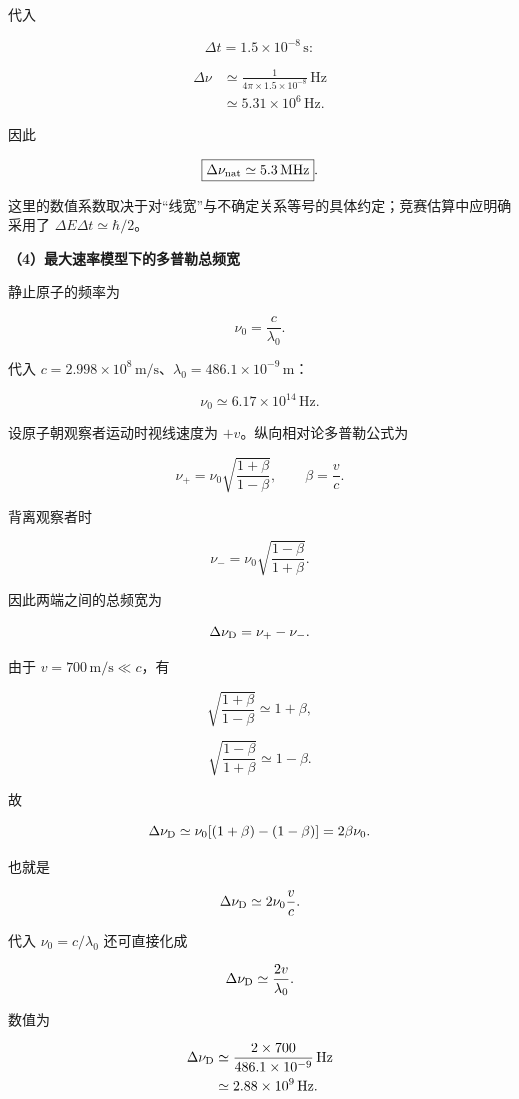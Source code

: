 \documentclass[12pt,a4paper,UTF8]{ctexart}
\begin{document}
代入

\[\Delta t=1.5\times10^{-8}\,\mathrm{s}:\]

\[
\begin{aligned}
\Delta\nu
&\simeq\frac{1}{4\pi\times1.5\times10^{-8}}\,\mathrm{Hz}\\
&\simeq5.31\times10^6\,\mathrm{Hz}.
\end{aligned}
\]

因此

\[
\boxed{\Delta\nu_{\rm nat}\simeq5.3\,\mathrm{MHz}}.
\]

这里的数值系数取决于对``线宽''与不确定关系等号的具体约定；竞赛估算中应明确采用了
\(\Delta E\Delta t\simeq\hbar/2\)。

\textbf{（4）最大速率模型下的多普勒总频宽}

静止原子的频率为

\[
\nu_0=\frac{c}{\lambda_0}.
\]

代入
\(c=2.998\times10^8\,\mathrm{m/s}\)、\(\lambda_0=486.1\times10^{-9}\,\mathrm m\)：

\[
\nu_0\simeq6.17\times10^{14}\,\mathrm{Hz}.
\]

设原子朝观察者运动时视线速度为 \(+v\)。纵向相对论多普勒公式为

\[
\nu_+=\nu_0\sqrt{\frac{1+\beta}{1-\beta}},
\qquad
\beta=\frac vc.
\]

背离观察者时

\[
\nu_-=\nu_0\sqrt{\frac{1-\beta}{1+\beta}}.
\]

因此两端之间的总频宽为

\[
\Delta\nu_{\rm D}=\nu_+-\nu_-.
\]

由于 \(v=700\,\mathrm{m/s}\ll c\)，有

\[
\sqrt{\frac{1+\beta}{1-\beta}}\simeq1+\beta,
\]

\[
\sqrt{\frac{1-\beta}{1+\beta}}\simeq1-\beta.
\]

故

\[
\Delta\nu_{\rm D}\simeq\nu_0[(1+\beta)-(1-\beta)]
=2\beta\nu_0.
\]

也就是

\[
\Delta\nu_{\rm D}\simeq2\nu_0\frac vc.
\]

代入 \(\nu_0=c/\lambda_0\) 还可直接化成

\[
\Delta\nu_{\rm D}\simeq\frac{2v}{\lambda_0}.
\]

数值为

\[
\begin{aligned}
\Delta\nu_{\rm D}
&\simeq\frac{2\times700}{486.1\times10^{-9}}\,\mathrm{Hz}\\
&\simeq2.88\times10^9\,\mathrm{Hz}.
\end{aligned}
\]
\end{document}

